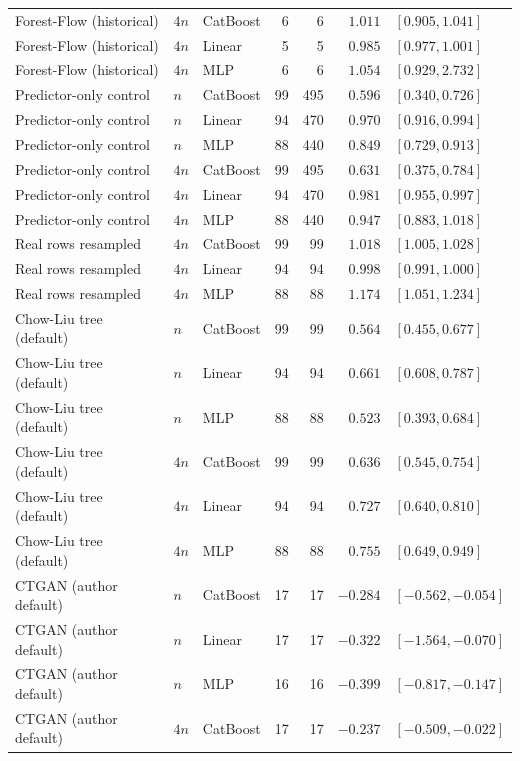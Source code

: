\begin{longtable}{@{}p{1.6in}llrrrl@{}}
Forest-Flow (historical) & $4n$ & CatBoost & 6 & 6 & $1.011$ & $[0.905, 1.041]$ \\
Forest-Flow (historical) & $4n$ & Linear & 5 & 5 & $0.985$ & $[0.977, 1.001]$ \\
Forest-Flow (historical) & $4n$ & MLP & 6 & 6 & $1.054$ & $[0.929, 2.732]$ \\
Predictor-only control & $n$ & CatBoost & 99 & 495 & $0.596$ & $[0.340, 0.726]$ \\
Predictor-only control & $n$ & Linear & 94 & 470 & $0.970$ & $[0.916, 0.994]$ \\
Predictor-only control & $n$ & MLP & 88 & 440 & $0.849$ & $[0.729, 0.913]$ \\
Predictor-only control & $4n$ & CatBoost & 99 & 495 & $0.631$ & $[0.375, 0.784]$ \\
Predictor-only control & $4n$ & Linear & 94 & 470 & $0.981$ & $[0.955, 0.997]$ \\
Predictor-only control & $4n$ & MLP & 88 & 440 & $0.947$ & $[0.883, 1.018]$ \\
Real rows resampled & $4n$ & CatBoost & 99 & 99 & $1.018$ & $[1.005, 1.028]$ \\
Real rows resampled & $4n$ & Linear & 94 & 94 & $0.998$ & $[0.991, 1.000]$ \\
Real rows resampled & $4n$ & MLP & 88 & 88 & $1.174$ & $[1.051, 1.234]$ \\
Chow-Liu tree (default) & $n$ & CatBoost & 99 & 99 & $0.564$ & $[0.455, 0.677]$ \\
Chow-Liu tree (default) & $n$ & Linear & 94 & 94 & $0.661$ & $[0.608, 0.787]$ \\
Chow-Liu tree (default) & $n$ & MLP & 88 & 88 & $0.523$ & $[0.393, 0.684]$ \\
Chow-Liu tree (default) & $4n$ & CatBoost & 99 & 99 & $0.636$ & $[0.545, 0.754]$ \\
Chow-Liu tree (default) & $4n$ & Linear & 94 & 94 & $0.727$ & $[0.640, 0.810]$ \\
Chow-Liu tree (default) & $4n$ & MLP & 88 & 88 & $0.755$ & $[0.649, 0.949]$ \\
CTGAN (author default) & $n$ & CatBoost & 17 & 17 & $-0.284$ & $[-0.562, -0.054]$ \\
CTGAN (author default) & $n$ & Linear & 17 & 17 & $-0.322$ & $[-1.564, -0.070]$ \\
CTGAN (author default) & $n$ & MLP & 16 & 16 & $-0.399$ & $[-0.817, -0.147]$ \\
CTGAN (author default) & $4n$ & CatBoost & 17 & 17 & $-0.237$ & $[-0.509, -0.022]$ \\

\end{longtable}
